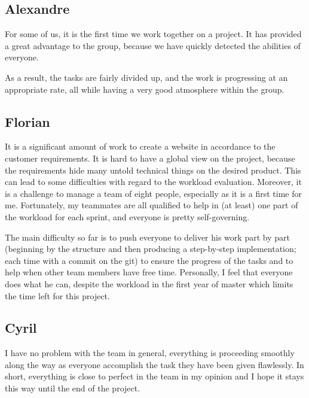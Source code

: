\subsection{Alexandre}

For some of us, it is the first time we work together on a project. It has provided a great advantage to the group, because we have quickly detected the abilities of everyone. \newline

As a result, the tasks are fairly divided up, and the work is progressing at an appropriate rate, all while having a very good atmosphere within the group.

\subsection{Florian}
It is a significant amount of work to create a website in accordance to the customer requirements. It is hard to have a global view on the project, because the requirements hide many untold technical things on the desired product. This can lead to some difficulties with regard to the workload evaluation. Moreover, it is a challenge to manage a team of eight people, especially as it is a first time for me. Fortunately, my
teammates are all qualified to help in (at least) one part of the workload for
each sprint, and everyone is pretty self-governing. \newline

The main difficulty so far is to push everyone to deliver his work part by
part (beginning by the structure and then producing a step-by-step
implementation; each time with a commit on the git) to ensure the progress
of the tasks and to help when other team members have free time.
Personally, I feel that everyone does what he can, despite the workload in
the first year of master which limits the time left for this project.\newline
\subsection{Cyril}

I have no problem with the team in general, everything is proceeding
smoothly along the way as everyone accomplish the task they have been given
flawlessly. In short, everything is close to perfect in the team in my
opinion and I hope it stays this way until the end of the project.
